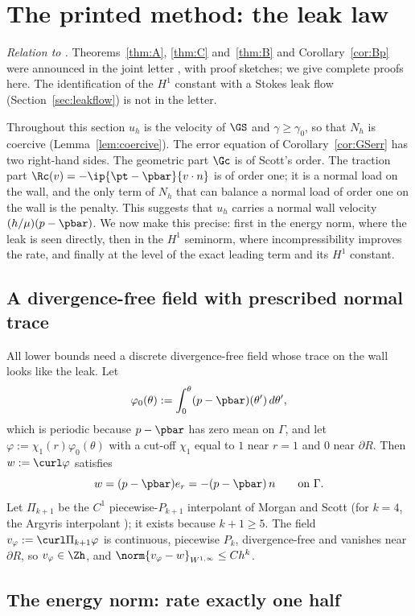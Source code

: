 \section{The printed method: the leak law}\label{sec:printed}

\emph{Relation to \cite{CavalcantePadhiLetter}.} Theorems~\ref{thm:A}, \ref{thm:C} and~\ref{thm:B} and Corollary~\ref{cor:Bp} were announced in the joint letter \cite{CavalcantePadhiLetter}, with proof sketches; we give complete proofs here. The identification of the $H^1$ constant with a Stokes leak flow (Section~\ref{sec:leakflow}) is not in the letter.

Throughout this section $u_h$ is the velocity of $\GS$ and $\gamma\ge\gamma_0$, so that $N_h$ is coercive (Lemma~\ref{lem:coercive}). The error equation of Corollary~\ref{cor:GSerr} has two right-hand sides. The geometric part $\Gc$ is of Scott's order. The traction part $\Rc(v)=-\ip{\pt-\pbar}{v\cdot n}$ is of order one; it is a normal load on the wall, and the only term of $N_h$ that can balance a normal load of order one on the wall is the penalty. This suggests that $u_h$ carries a normal wall velocity $(h/\mu)(p-\pbar)$. We now make this precise: first in the energy norm, where the leak is seen directly, then in the $H^1$ seminorm, where incompressibility improves the rate, and finally at the level of the exact leading term and its $H^1$ constant.

\subsection{A divergence-free field with prescribed normal trace}
All lower bounds need a discrete divergence-free field whose trace on the wall looks like the leak. Let
\[
\varphi_0(\theta):=\int_0^\theta(p-\pbar)(\theta')\,d\theta',
\]
which is periodic because $p-\pbar$ has zero mean on $\Gamma$, and let $\varphi:=\chi_1(r)\varphi_0(\theta)$ with a cut-off $\chi_1$ equal to $1$ near $r=1$ and $0$ near $\partial R$. Then $w:=\curl\varphi$ satisfies
\[
w=(p-\pbar)e_r=-(p-\pbar)\,n\qquad\text{on }\Gamma .
\]
Let $\Pi_{k+1}$ be the $C^1$ piecewise-$P_{k+1}$ interpolant of Morgan and Scott \cite{MorganScott1975} (for $k=4$, the Argyris interpolant \cite{Argyris1968}); it exists because $k+1\ge5$. The field $v_\varphi:=\curl\Pi_{k+1}\varphi$ is continuous, piecewise $P_k$, divergence-free and vanishes near $\partial R$, so $v_\varphi\in\Zh$, and $\norm{v_\varphi-w}_{W^{1,\infty}}\le Ch^k$.

\subsection{The energy norm: rate exactly one half}

